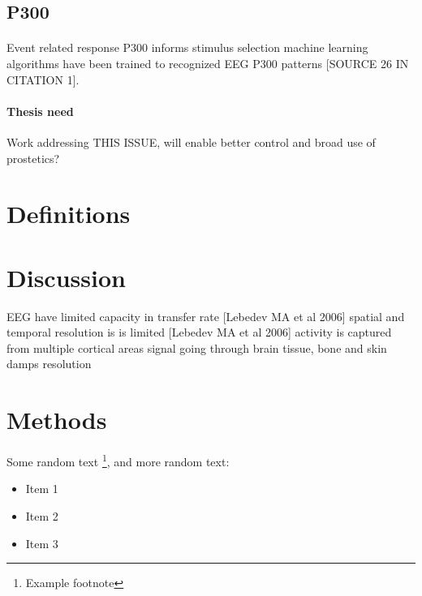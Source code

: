 \documentclass[twoside]{article}
\begin{document}
\subsection{P300}
\paragraph{}
Event related response P300
informs stimulus selection
machine learning algorithms have been trained to recognized EEG P300 patterns [SOURCE 26 IN CITATION 1].

\paragraph{Thesis need}
Work addressing THIS ISSUE, will enable better control and broad use of prostetics?


\blindtext

\blindtext

\section{Definitions}

\blindtext

\blindtext
\section{Discussion}
EEG
  have limited capacity in transfer rate [Lebedev MA et al 2006]
  spatial and temporal resolution is is limited [Lebedev MA et al 2006]
    activity is captured from multiple cortical areas
    signal going through brain tissue, bone and skin damps resolution



\section{Methods}

Some random text \footnote{Example footnote}, and more random text:

\begin{itemize}
\item Item 1 %
\item Item 2
\item Item 3
\end{itemize}



\end{document}
